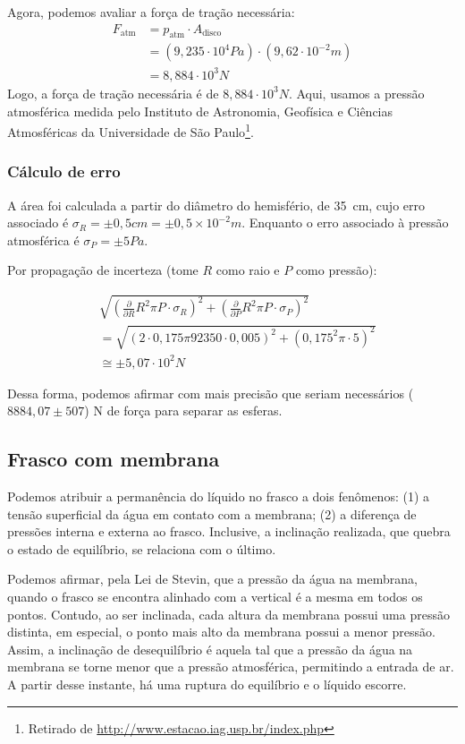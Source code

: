 Agora, podemos avaliar a força de tração necessária:
\begin{align*}
    F_{\text{atm}} &= p_{\text{atm}} \cdot A_{\text{disco}}\\
    &= (9,235 \cdot 10^4 \unit{Pa}) \cdot (9,62 \cdot 10^{-2} \unit{m})\\
    &= 8,884 \cdot 10^3 \unit{N}
\end{align*}
Logo, a força de tração necessária é de \( 8,884 \cdot 10^3 \unit{N} \). 
Aqui, usamos a pressão atmosférica medida pelo Instituto de Astronomia,
Geofísica e Ciências Atmosféricas da Universidade de São Paulo\footnote{Retirado
de \url{http://www.estacao.iag.usp.br/index.php}}.

\subsubsection{Cálculo de erro}
A área foi calculada a partir do diâmetro do hemisfério, de \qty{35}{cm},
cujo erro associado é \(\sigma_R = \pm 0,5 \unit{cm} =
\pm 0,5 \times 10^{-2} \unit{m} \).
Enquanto o erro associado à pressão atmosférica é \(\sigma_P = \pm 5
\unit{Pa}\).

Por propagação de incerteza (tome \(R\) como raio e \(P\) como pressão):

\begin{align*}
&\sqrt{\left( \frac{\partial }{\partial R} R^{2}\pi P \cdot \sigma_R \right)^{2} + \left( \frac{\partial }{\partial P} R^{2}\pi P \cdot\sigma_P \right)^{2}}\\
&= \sqrt{\left( 2 \cdot 0,175 \pi 92350 \cdot 0,005 \right)^{2} + \left(0,175^{2}\pi \cdot 5 \right)^{2}} \\
&\cong  \pm 5,07 \cdot 10^2 \unit{N}
\end{align*}

Dessa forma, podemos afirmar com mais precisão que seriam necessários
(\(8884,07 \pm 507 \)) N de força para separar as esferas.

\subsection{Frasco com membrana}

Podemos atribuir a permanência do líquido no frasco a dois fenômenos: (1) a
tensão superficial da água em contato com a membrana; (2) a diferença de
pressões interna e externa ao frasco. Inclusive, a inclinação realizada, que
quebra o estado de equilíbrio, se relaciona com o último. 

Podemos afirmar, pela Lei de Stevin, que a pressão da água na membrana, quando o
frasco se encontra alinhado com a vertical é a mesma em todos os pontos.
Contudo, ao ser inclinada, cada altura da membrana possui uma pressão distinta,
em especial, o ponto mais alto da membrana possui a menor pressão. Assim, a
inclinação de desequilíbrio é aquela tal que a pressão da água na membrana se
torne menor que a pressão atmosférica, permitindo a entrada de ar. A partir
desse instante, há uma ruptura do equilíbrio e o líquido escorre.
